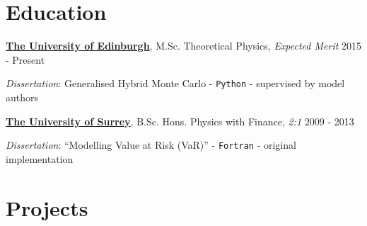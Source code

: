 \documentclass[margin, line]{res}
\newcommand{\EdPS}{http://www.drps.ed.ac.uk/15-16/dpt/cxpgph11085.htm}
\newcommand{\EdSym}{http://www.drps.ed.ac.uk/15-16/dpt/cxpgph11097.htm}
\newcommand{\EdSMod}{http://www.drps.ed.ac.uk/15-16/dpt/cxmath11029.htm}
\newcommand{\EdQT}{http://www.drps.ed.ac.uk/15-16/dpt/cxphys11019.htm}
\newcommand{\EdPP}{http://www.drps.ed.ac.uk/15-16/dpt/cxphys11042.htm}
\newcommand{\EdMQFT}{http://www.drps.ed.ac.uk/15-16/dpt/cxpgph11094.htm}
\newcommand{\UoS}{http://www.surrey.ac.uk/physics/}
\newcommand{\UoE}{https://higgs.ph.ed.ac.uk}
\newcommand{\BFGS}{http://en.wikipedia.org/wiki/Broyden-Fletcher-Goldfarb-Shanno_algorithm}
\newcommand{\GARCH}{https://www.quantnet.com/threads/student-t-innovation-problems-garch-1-1.15612/\#post-125141}
\newcommand{\Jim}{http://www.jimal-khalili.com/teaching}
\newenvironment{list1}{
	\begin{list}{\ding{113}}{%
		\setlength{\itemsep}{0in}
		\setlength{\parsep}{0in} \setlength{\parskip}{0in}
		\setlength{\topsep}{0in} \setlength{\partopsep}{0in}
		\setlength{\leftmargin}{0.17in}}}{\end{list}}
\newenvironment{list2}{
	\begin{list}{$\bullet$}{%
		\setlength{\itemsep}{0in}
		\setlength{\parsep}{0in} \setlength{\parskip}{0in}
		\setlength{\topsep}{0in} \setlength{\partopsep}{0in}
		\setlength{\leftmargin}{0.2in}}}{\end{list}}
\begin{document}
\begin{resume}
\vspace{0.15in}
\section{\sc Education}
{\bf \href{\UoE}{The University of Edinburgh}}, M.Sc. Theoretical Physics, \emph{Expected Merit} \hfill {2015 - Present}
\\
	\vspace*{-.15in}
	\begin{list1}
		\item[] \emph{Dissertation}: Generalised Hybrid Monte Carlo - \verb|Python| -
		supervised by model authors
	\end{list1}
		\vspace*{-.1in}

{\bf \href{\UoS}{The University of Surrey}}, B.Sc. Hons. Physics with Finance, \textit{2:1}
\hfill {2009 - 2013}
\\
	\vspace*{-.15in}
	\begin{list1}
		\item[] \emph{Dissertation}: ``Modelling Value at Risk (VaR)'' %
			- \verb|Fortran| - original implementation
	\end{list1}
	\vspace*{-.1in}


\vspace{0.15in}
\section{\sc Projects}


\end{resume}
\end{document}
